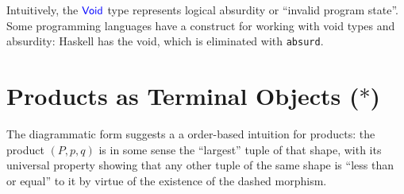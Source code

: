 \begin{mathpar}
\end{mathpar}

Intuitively, the $\plVoid$ type represents logical absurdity or 
``invalid program state''.
Some programming languages have a construct for working with 
void types and absurdity: Haskell has the void, which is 
eliminated with \texttt{absurd}.



\section{Products as Terminal Objects ($*$)}
\label{sec:products-as-terminal-objects}

The diagrammatic form suggests a
a order-based intuition for products:
the product \((P,p,q)\) is
in some sense the ``largest''
tuple of that shape,
with its universal property
showing that any other tuple of the same shape is
``less than or equal'' to it by virtue of the existence of
the dashed morphism.

